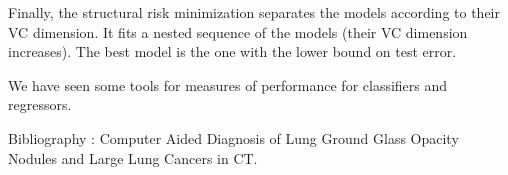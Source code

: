 \documentclass[a4paper,12pt]{article}
\begin{document}
Finally, the structural risk minimization separates the models according to their VC dimension. It fits a nested sequence of the models (their VC dimension increases). The best model is the one with the lower bound on test error.  

\vspace{10pt}
We have seen some tools for measures of performance for classifiers and regressors.
\vspace{60pt}

Bibliography : 
Computer Aided Diagnosis of Lung Ground Glass Opacity Nodules and Large Lung Cancers in CT.
\end{document}
